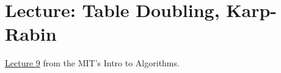 \chapter{Lecture: Table Doubling, Karp-Rabin}
\href{https://ocw.mit.edu/courses/electrical-engineering-and-computer-science/6-006-introduction-to-algorithms-fall-2011/lecture-videos/lecture-9-table-doubling-karp-rabin/}{Lecture 9} 
from the MIT's  Intro to Algorithms.